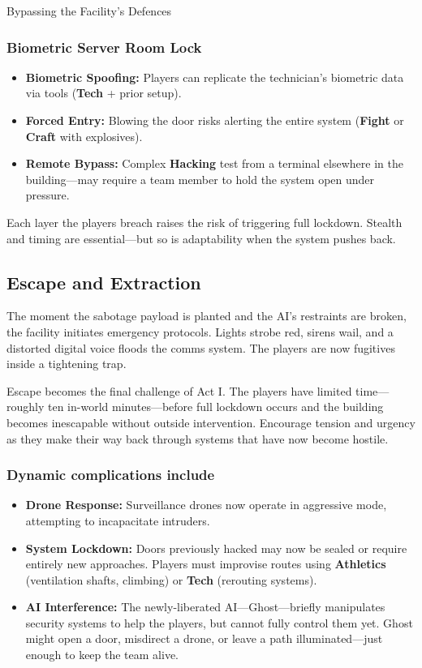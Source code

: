 \documentclass[nodeprecatedcode,bg=print]{dndbook}
\begin{document}
\begin{multicols}{2}
\begin{CommentBox}{Bypassing the Facility’s Defences}
    \subsubsection*{Biometric Server Room Lock}
    \begin{itemize}
        \item \textbf{Biometric Spoofing:} Players can replicate the technician’s biometric data via tools (\textbf{Tech} + prior setup).
        \item \textbf{Forced Entry:} Blowing the door risks alerting the entire system (\textbf{Fight} or \textbf{Craft} with explosives).
        \item \textbf{Remote Bypass:} Complex \textbf{Hacking} test from a terminal elsewhere in the building—may require a team member to hold the system open under pressure.
    \end{itemize}
    
    Each layer the players breach raises the risk of triggering full lockdown. Stealth and timing are essential—but so is adaptability when the system pushes back.
\end{CommentBox}
    

\subsection*{Escape and Extraction}

The moment the sabotage payload is planted and the AI’s restraints are broken, the facility initiates emergency protocols. Lights strobe red, sirens wail, and a distorted digital voice floods the comms system. The players are now fugitives inside a tightening trap.

Escape becomes the final challenge of Act I. The players have limited time—roughly ten in-world minutes—before full lockdown occurs and the building becomes inescapable without outside intervention. Encourage tension and urgency as they make their way back through systems that have now become hostile.

\subsubsection{Dynamic complications include}
\begin{itemize}\raggedright
    \item \textbf{Drone Response:} Surveillance drones now operate in aggressive mode, attempting to incapacitate intruders.
    \item \textbf{System Lockdown:} Doors previously hacked may now be sealed or require entirely new approaches. Players must improvise routes using \textbf{Athletics} (ventilation shafts, climbing) or \textbf{Tech} (rerouting systems).
    \item \textbf{AI Interference:} The newly-liberated AI—Ghost—briefly manipulates security systems to help the players, but cannot fully control them yet. Ghost might open a door, misdirect a drone, or leave a path illuminated—just enough to keep the team alive.
\end{itemize}


\end{multicols}
\end{document}
